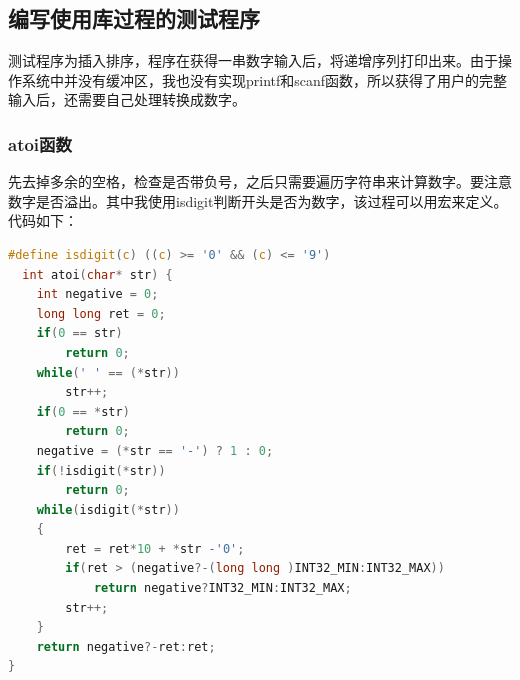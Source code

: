 \documentclass[a4paper, 11pt]{article} %
\begin{document}
\subsection{编写使用库过程的测试程序}
测试程序为插入排序，程序在获得一串数字输入后，将递增序列打印出来。由于操作系统中并没有缓冲区，我也没有实现printf和scanf函数，所以获得了用户的完整输入后，还需要自己处理转换成数字。

\subsubsection{atoi函数}
先去掉多余的空格，检查是否带负号，之后只需要遍历字符串来计算数字。要注意数字是否溢出。其中我使用isdigit判断开头是否为数字，该过程可以用宏来定义。代码如下：
\begin{lstlisting}[language={c},label=atoi,caption=atoi函数]
  #define isdigit(c) ((c) >= '0' && (c) <= '9')
  int atoi(char* str) {
    int negative = 0;
    long long ret = 0;
    if(0 == str)
        return 0;
    while(' ' == (*str))
        str++;
    if(0 == *str)
        return 0;
    negative = (*str == '-') ? 1 : 0;
    if(!isdigit(*str))
        return 0;
    while(isdigit(*str))
    {
        ret = ret*10 + *str -'0';
        if(ret > (negative?-(long long )INT32_MIN:INT32_MAX))
            return negative?INT32_MIN:INT32_MAX;
        str++;
    }
    return negative?-ret:ret;
}
\end{lstlisting}
\end{document}
